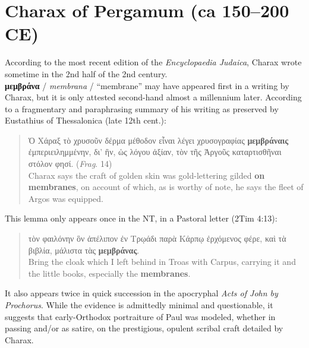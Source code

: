 %
%
\chapter{Charax of Pergamum (ca 150--200 CE)}%
\vspace*{3mm}%
\justifying%
%
\noindent{}According to the most recent edition of the \textit{Encyclopaedia Judaica}, %
Charax wrote sometime in the 2nd half of the 2nd century. \\[1.5mm] %

\noindent{}\textbf{μεμβράνα} / \textit{membrana} / “membrane” may have appeared first %
in a writing by Charax, but it is only attested second-hand almost a %
millennium later. %
According to a fragmentary and paraphrasing summary %
of his writing as preserved by Eustathius of Thessalonica (late 12th cent.): %

\vspace*{3mm} 
 \begin{quote}Ὁ Χάραξ τὸ χρυσοῦν δέρμα μέθοδον εἶναι λέγει %
 χρυσογραφίας \textbf{μεμβράναις} ἐμπεριειλημμένην, %
 δι’ ἣν, ὡς λόγου ἀξίαν, %
 τὸν τῆς Ἀργοῦς καταρτισθῆναι στόλον φησί. (\textit{Frag}. 14) \\[1mm] %
 Charax says the craft of golden skin was gold-lettering gilded \textbf{on membranes}, %
 on account of which, as is worthy of note, %
 he says the fleet of Argos was equipped. \end{quote} %
 \vspace*{3mm} 

\noindent{}This lemma only appears once in the NT, %
in a Pastoral letter (2Tim 4:13): 

\vspace*{3mm} 
 \begin{quote}τὸν φαιλόνην ὃν ἀπέλιπον ἐν Τρῳάδι παρὰ Κάρπῳ
 ἐρχόμενος φέρε, καὶ τὰ βιβλία, μάλιστα τὰς \textbf{μεμβράνας}. \\[1mm] %
 Bring the cloak which I left behind in Troas with Carpus, %
 carrying it and the little books, especially the \textbf{membranes}. \end{quote} %
 \vspace*{3mm}

\noindent{}It also appears twice in quick succession in the apocryphal %
\textit{Acts of John by Prochorus}.
While the evidence is admittedly minimal and questionable, %
it suggests that early-Orthodox portraiture of Paul %
was modeled, whether in passing and/or as satire, %
on the prestigious, opulent scribal craft detailed by Charax. %